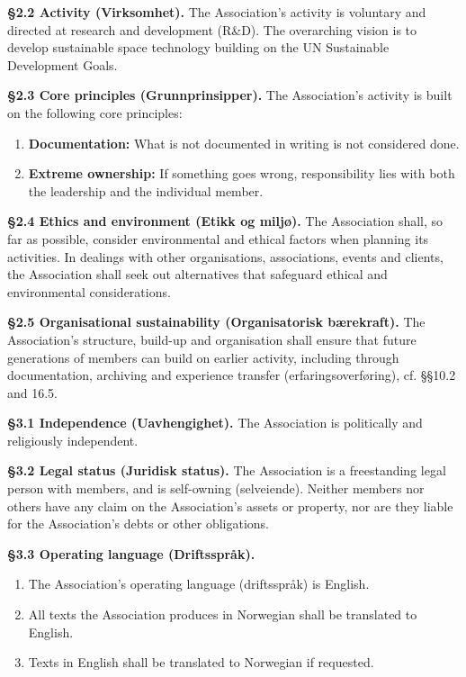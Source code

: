 \documentclass{../../../Common/Latex/Templates/rapport}
\begin{document}
\textbf{\S 2.2 Activity (Virksomhet).}\label{bylaw:2.2} The Association's activity is voluntary and directed at research and development (R\&D). The overarching vision is to develop sustainable space technology building on the UN Sustainable Development Goals.

\textbf{\S 2.3 Core principles (Grunnprinsipper).}\label{bylaw:2.3} The Association's activity is built on the following core principles:
\begin{enumerate}
  \item \textbf{Documentation:} What is not documented in writing is not considered done.
  \item \textbf{Extreme ownership:} If something goes wrong, responsibility lies with both the leadership and the individual member.
\end{enumerate}

\textbf{\S 2.4 Ethics and environment (Etikk og miljø).}\label{bylaw:2.4} The Association shall, so far as possible, consider environmental and ethical factors when planning its activities. In dealings with other organisations, associations, events and clients, the Association shall seek out alternatives that safeguard ethical and environmental considerations.

\textbf{\S 2.5 Organisational sustainability (Organisatorisk bærekraft).}\label{bylaw:2.5} The Association's structure, build-up and organisation shall ensure that future generations of members can build on earlier activity, including through documentation, archiving and experience transfer (erfaringsoverføring), cf. \S\S10.2 and 16.5.

\label{bylaw:3}
\textbf{\S 3.1 Independence (Uavhengighet).}\label{bylaw:3.1} The Association is politically and religiously independent.

\textbf{\S 3.2 Legal status (Juridisk status).}\label{bylaw:3.2} The Association is a freestanding legal person with members, and is self-owning (selveiende). Neither members nor others have any claim on the Association's assets or property, nor are they liable for the Association's debts or other obligations.

\textbf{\S 3.3 Operating language (Driftsspråk).}\label{bylaw:3.3}
\begin{enumerate}
  \item The Association's operating language (driftsspråk) is English.
  \item All texts the Association produces in Norwegian shall be translated to English.
  \item Texts in English shall be translated to Norwegian if requested.
\end{enumerate}
\end{document}
